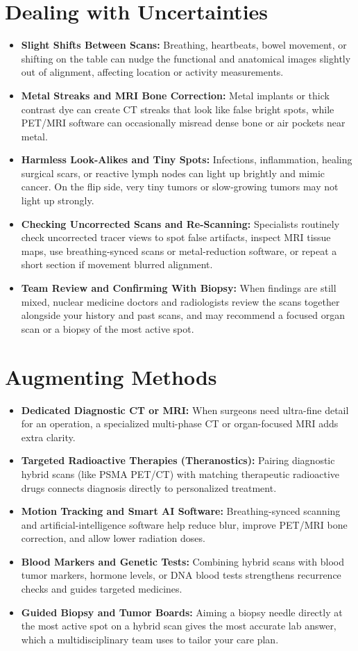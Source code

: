 \section{Dealing with Uncertainties}
\begin{itemize}
    \item \textbf{Slight Shifts Between Scans:} Breathing, heartbeats, bowel movement, or shifting on the table can nudge the functional and anatomical images slightly out of alignment, affecting location or activity measurements.
    \item \textbf{Metal Streaks and MRI Bone Correction:} Metal implants or thick contrast dye can create CT streaks that look like false bright spots, while PET/MRI software can occasionally misread dense bone or air pockets near metal.
    \item \textbf{Harmless Look-Alikes and Tiny Spots:} Infections, inflammation, healing surgical scars, or reactive lymph nodes can light up brightly and mimic cancer. On the flip side, very tiny tumors or slow-growing tumors may not light up strongly.
    \item \textbf{Checking Uncorrected Scans and Re-Scanning:} Specialists routinely check uncorrected tracer views to spot false artifacts, inspect MRI tissue maps, use breathing-synced scans or metal-reduction software, or repeat a short section if movement blurred alignment.
    \item \textbf{Team Review and Confirming With Biopsy:} When findings are still mixed, nuclear medicine doctors and radiologists review the scans together alongside your history and past scans, and may recommend a focused organ scan or a biopsy of the most active spot.
\end{itemize}

\section{Augmenting Methods}
\begin{itemize}
    \item \textbf{Dedicated Diagnostic CT or MRI:} When surgeons need ultra-fine detail for an operation, a specialized multi-phase CT or organ-focused MRI adds extra clarity.
    \item \textbf{Targeted Radioactive Therapies (Theranostics):} Pairing diagnostic hybrid scans (like PSMA PET/CT) with matching therapeutic radioactive drugs connects diagnosis directly to personalized treatment.
    \item \textbf{Motion Tracking and Smart AI Software:} Breathing-synced scanning and artificial-intelligence software help reduce blur, improve PET/MRI bone correction, and allow lower radiation doses.
    \item \textbf{Blood Markers and Genetic Tests:} Combining hybrid scans with blood tumor markers, hormone levels, or DNA blood tests strengthens recurrence checks and guides targeted medicines.
    \item \textbf{Guided Biopsy and Tumor Boards:} Aiming a biopsy needle directly at the most active spot on a hybrid scan gives the most accurate lab answer, which a multidisciplinary team uses to tailor your care plan.
\end{itemize}

